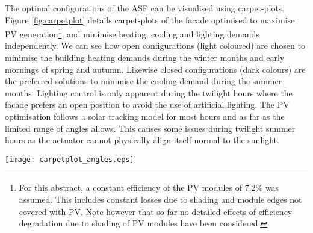 


The optimal configurations of the ASF can be visualised using carpet-plots. Figure \ref{fig:carpetplot} details carpet-plots of the facade optimised to maximise PV generation\footnote{For this abstract, a constant efficiency of the PV modules of 7.2\% was assumed. This includes constant losses due to shading and module edges not covered with PV. Note however that so far no detailed effects of efficiency degradation due to shading of PV modules have been considered.}, and minimise heating, cooling and lighting demands independently. We can see how open configurations (light coloured) are chosen to minimise the building heating demands during the winter months and early mornings of spring and autumn. Likewise closed configurations (dark colours) are the preferred solutions to minimise the cooling demand during the summer months. Lighting control is only apparent during the twilight hours where the facade prefers an open position to avoid the use of artificial lighting. The PV optimisation follows a solar tracking model for most hours and as far as the limited range of angles allows. This causes some issues during twilight summer hours as the actuator cannot physically align itself normal to the sunlight. 




\begin{figure*}
\begin{center}
\texttt{[image: carpetplot\_angles.eps]}
\caption{Carpet plots detailing the optimal configuration to minimise the (a) heating demand, (b) cooling demand, (c) lighting demand, and (d) maximise irradiance on PV panels. Each configuration is represented by an angle of orientation around the x-axis (Altitude) and y-axis (Azimuth) as seen in the legend. Figure (e) details the combinations for optimum building thermal management without PV production. (f) also includes the PV production}
\label{fig:carpetplot}
\end{center}
\end{figure*}

